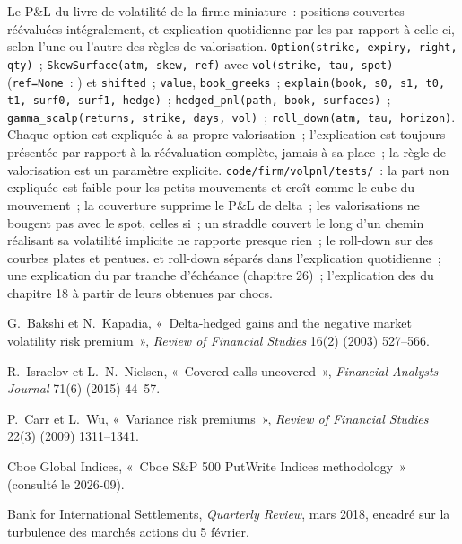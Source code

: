 \begin{build}
 Le P\&L du livre de volatilité de la firme miniature~: positions couvertes réévaluées intégralement, et explication quotidienne par les  par rapport à celle-ci, selon
l'une ou l'autre des règles de valorisation.
 \texttt{Option(strike, expiry, right, qty)}~; \texttt{SkewSurface(atm, skew, ref)} avec \texttt{vol(strike, tau, spot)}
(\texttt{ref=None}~: ) et \texttt{shifted}~; \texttt{value}, \texttt{book\_greeks}~; \texttt{explain(book, s0, s1, t0, t1, surf0, surf1,
hedge)}~; \texttt{hedged\_pnl(path, book, surfaces)}~; \texttt{gamma\_scalp(returns, strike, days, vol)}~; \texttt{roll\_down(atm, tau, horizon)}.
 Chaque option est expliquée à sa propre valorisation~; l'explication est toujours présentée par rapport à la réévaluation complète, jamais à sa place~; la
règle de valorisation est un paramètre explicite.
 \texttt{code/firm/volpnl/tests/}~: la part non expliquée est faible pour les petits mouvements et croît comme le cube du mouvement~; la
couverture supprime le P\&L de delta~; les valorisations  ne bougent pas avec le spot, celles  si~; un straddle couvert le long d'un chemin réalisant sa
volatilité implicite ne rapporte presque rien~; le roll-down sur des courbes plates et pentues.
  et roll-down séparés dans l'explication quotidienne~; une explication du  par tranche d'échéance (chapitre 26)~; l'explication des
 du chapitre 18 à partir de leurs  obtenues par chocs.
\end{build}

\begin{omsources}
\item G.~Bakshi et N.~Kapadia, «~Delta-hedged gains and the negative market volatility risk premium~», \emph{Review of Financial Studies} 16(2)
(2003) 527--566.
\item R.~Israelov et L.~N.~Nielsen, «~Covered calls uncovered~», \emph{Financial Analysts Journal} 71(6) (2015) 44--57.
\item P.~Carr et L.~Wu, «~Variance risk premiums~», \emph{Review of Financial Studies} 22(3) (2009) 1311--1341.
\item Cboe Global Indices, «~Cboe S\&P 500 PutWrite Indices methodology~» (consulté le 2026-09).
\item Bank for International Settlements, \emph{Quarterly Review}, mars 2018, encadré sur la turbulence des marchés actions du 5 février.
\end{omsources}

